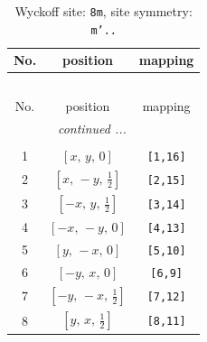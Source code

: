 \documentclass[fleqn,8pt]{jsarticle}
\begin{document}
\begin{longtable}{ccc}
\caption{Wyckoff site: {\tt 8m}, site symmetry: {\tt m'..}}
 \\
 \hline \hline
No. & position & mapping \\ \hline \endfirsthead

\multicolumn{2}{l}{\tablename\ \thetable{}} \\
 \hline \hline
No. & position & mapping \\ \hline \endhead

 \hline \hline
\multicolumn{2}{r}{\footnotesize\it continued ...} \\ \endfoot

 \hline \hline
\multicolumn{2}{r}{} \\ \endlastfoot

1 & $\left[ x,\, y,\, 0 \right]$ & {\tt [1,16]} \\ \hline
2 & $\left[ x,\, - y,\, \frac{1}{2} \right]$ & {\tt [2,15]} \\ \hline
3 & $\left[ - x,\, y,\, \frac{1}{2} \right]$ & {\tt [3,14]} \\ \hline
4 & $\left[ - x,\, - y,\, 0 \right]$ & {\tt [4,13]} \\ \hline
5 & $\left[ y,\, - x,\, 0 \right]$ & {\tt [5,10]} \\ \hline
6 & $\left[ - y,\, x,\, 0 \right]$ & {\tt [6,9]} \\ \hline
7 & $\left[ - y,\, - x,\, \frac{1}{2} \right]$ & {\tt [7,12]} \\ \hline
8 & $\left[ y,\, x,\, \frac{1}{2} \right]$ & {\tt [8,11]} \\
\end{longtable}
\renewcommand{\arraystretch}{1.2}
\end{document}
